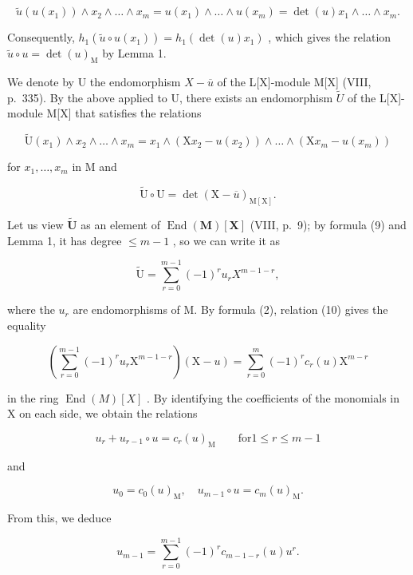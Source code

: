 \[
\widetilde {u} (u (x _ {1})) \wedge x _ {2} \wedge \dots \wedge x _ {m} = u (x _ {1}) \wedge \dots \wedge u (x _ {m}) = \det (u) x _ {1} \wedge \dots \wedge x _ {m}.
\]

Consequently, \(h_1(\widetilde{u} \circ u(x_1)) = h_1(\det(u)x_1)\) , which gives the relation \(\widetilde{u} \circ u = \det(u)_\mathrm{M}\) by Lemma 1.

We denote by U the endomorphism \(X - \overline{u}\) of the L{[}X{]}-module M{[}X{]} (VIII, p.~335). By the above applied to U, there exists an endomorphism \(\widetilde{U}\) of the L{[}X{]}-module M{[}X{]} that satisfies the relations

\[
\widetilde {\mathrm{U}} (x _ {1}) \wedge x _ {2} \wedge \dots \wedge x _ {m} = x _ {1} \wedge (\mathrm{X} x _ {2} - u (x _ {2})) \wedge \dots \wedge (\mathrm{X} x _ {m} - u (x _ {m}))\tag{9}
\]

for \(x_{1},\ldots ,x_{m}\) in M and

\[
\widetilde {\mathrm{U}} \circ \mathrm{U} = \det (\mathrm{X} - \overline {{u}}) _ {\mathrm{M} [ \mathrm{X} ]}.\tag{10}
\]

Let us view \(\widetilde{\mathbf{U}}\) as an element of \(\operatorname{End}(\mathbf{M})[\mathbf{X}]\) (VIII, p.~9); by formula (9) and Lemma 1, it has degree \(\leqslant m - 1\) , so we can write it as

\[
\widetilde {\mathrm{U}} = \sum_ {r = 0} ^ {m - 1} (- 1) ^ {r} u _ {r} X ^ {m - 1 - r},\tag{11}
\]

where the \(u_{r}\) are endomorphisms of M. By formula (2), relation (10) gives the equality

\[
\left(\sum_ {r = 0} ^ {m - 1} (- 1) ^ {r} u _ {r} \mathrm{X} ^ {m - 1 - r}\right) (\mathrm{X} - u) = \sum_ {r = 0} ^ {m} (- 1) ^ {r} c _ {r} (u) \mathrm{X} ^ {m - r}\tag{12}
\]

in the ring \(\operatorname{End}(M)[X]\) . By identifying the coefficients of the monomials in X on each side, we obtain the relations

\[
u _ {r} + u _ {r - 1} \circ u = c _ {r} (u) _ {\mathrm{M}} \qquad \mathrm{for} 1 \leqslant r \leqslant m - 1\tag{13}
\]

and

\[
u _ {0} = c _ {0} (u) _ {\mathrm{M}}, \quad u _ {m - 1} \circ u = c _ {m} (u) _ {\mathrm{M}}.\tag{14}
\]

From this, we deduce

\[
u _ {m - 1} = \sum_ {r = 0} ^ {m - 1} (- 1) ^ {r} c _ {m - 1 - r} (u) u ^ {r}.\tag{15}
\]

